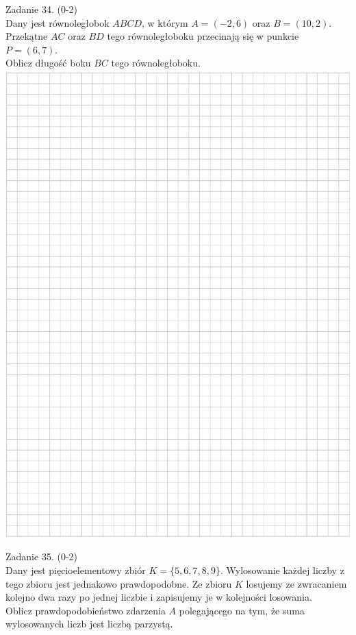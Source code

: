 \documentclass[10pt]{article}
\begin{document}
Zadanie 34. (0-2)\\
Dany jest równoległobok \(A B C D\), w którym \(A=(-2,6)\) oraz \(B=(10,2)\). Przekątne \(A C\) oraz \(B D\) tego równoległoboku przecinają się w punkcie \(P=(6,7)\).\\
Oblicz długość boku \(B C\) tego równoległoboku.\\
\includegraphics[max width=\textwidth, center]{2024_11_21_0a35d272448d5080a489g-26}

Zadanie 35. (0-2)\\
Dany jest pięcioelementowy zbiór \(K=\{5,6,7,8,9\}\). Wylosowanie każdej liczby z tego zbioru jest jednakowo prawdopodobne. Ze zbioru \(K\) losujemy ze zwracaniem kolejno dwa razy po jednej liczbie i zapisujemy je w kolejności losowania.\\
Oblicz prawdopodobieństwo zdarzenia \(A\) polegającego na tym, że suma wylosowanych liczb jest liczbą parzystą.
\end{document}
